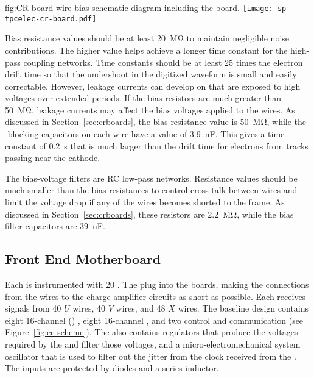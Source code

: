 \begin{dunefigure}
{fig:CR-board}
{  wire bias schematic diagram including the  board.}
\texttt{[image: sp-tpcelec-cr-board.pdf]}
\end{dunefigure}

Bias resistance values should be at least \SI{20}{\mega\ohm} to 
maintain negligible noise contributions. The higher value helps 
achieve a longer time constant for the high-pass coupling networks.
Time constants should be at least \num{25} times the electron 
drift time so that the undershoot in the digitized waveform
is small and easily correctable. However, leakage currents can 
develop on  that are exposed to high voltages over 
extended periods. If the bias resistors are much greater than 
\SI{50}{\mega\ohm}, leakage currents may affect the bias voltages 
applied to the wires. As discussed in Section~\ref{sec:crboards},
the bias resistance value is \SI{50}{\mega\ohm}, while the 
-blocking capacitors on each wire have a value of
\SI{3.9}{nF}. This gives a time constant of \SI{0.2}{s} that
is much larger than the drift time for electrons from tracks
passing near the cathode.

The bias-voltage filters are RC low-pass networks. Resistance 
values should be much smaller than the bias resistances to control 
cross-talk between wires and limit the voltage drop if any of the 
wires becomes shorted to the  frame. As discussed
in Section~\ref{sec:crboards}, these resistors are %
\SI{2.2}{\mega\ohm}, while the bias filter capacitors are \SI{39}{nF}.

\subsection{Front End Motherboard}
\label{sec:fdsp-tpcelec-design-femb}

Each  is instrumented with \num{20} .
The  plug into the   boards, 
making the connections from the wires to the charge amplifier 
circuits as short as possible. Each  receives signals 
from \num{40} $U$ wires, \num{40} $V$ wires, and \num{48} $X$ wires.
The baseline  design contains eight \num{16}-channel 
 () , eight \num{16}-channel 
 , and two  control and 
communication  (see Figure~\ref{fig:ce-scheme}).
The  also contains regulators that produce the voltages 
required by the  and filter those voltages, and 
a micro-electromechanical system oscillator that is used to
filter out the jitter from the clock received from the .
The  inputs are protected by diodes and a series inductor.

